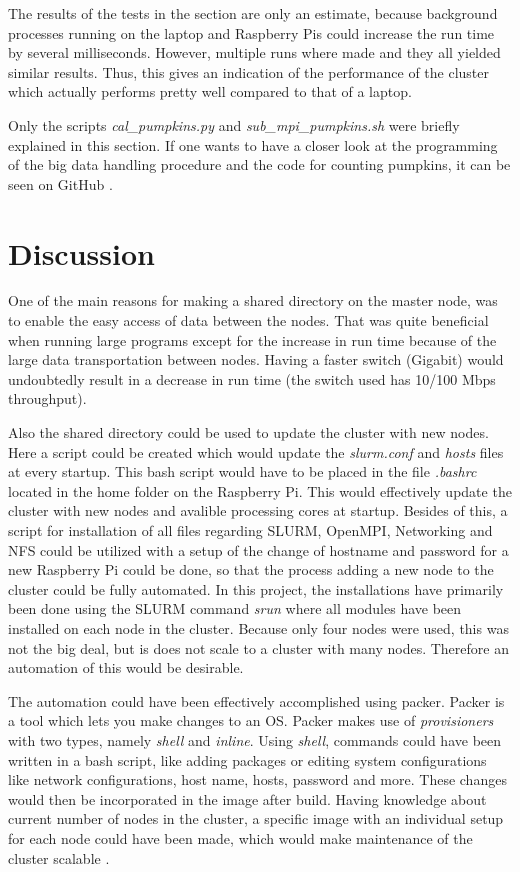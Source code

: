 \documentclass[../Head/Report.tex]{subfiles}
\begin{document}
The results of the tests in the section are only an estimate, because background processes running on the laptop and Raspberry Pis could increase the run time by several milliseconds. However, multiple runs where made and they all yielded similar results. Thus, this gives an indication of the performance of the cluster which actually performs pretty well compared to that of a laptop. 

Only the scripts \textit{cal\_pumpkins.py} and \textit{sub\_mpi\_pumpkins.sh} were briefly explained in this section. If one wants to have a closer look at the programming of the big data handling procedure and the code for counting pumpkins, it can be seen on GitHub \cite{kenni_github}. 
 
\section{Discussion}
One of the main reasons for making a shared directory on the master node, was to enable the easy access of data between the nodes. That was quite beneficial when running large programs except for the increase in run time because of the large data transportation between nodes. Having a faster switch (Gigabit) would undoubtedly result in a decrease in run time (the switch used has 10/100 Mbps throughput).  

Also the shared directory could be used to update the cluster with new nodes. Here a script could be created which would update the \textit{slurm.conf} and \textit{hosts} files at every startup. This bash script would have to be placed in the file \textit{.bashrc} located in the home folder on the Raspberry Pi. This would effectively update the cluster with new nodes and avalible processing cores at startup. Besides of this, a script for installation of all files regarding SLURM, OpenMPI, Networking and NFS could be utilized with a setup of the change of hostname and password for a new Raspberry Pi could be done, so that the process adding a new node to the cluster could be fully automated. In this project, the installations have primarily been done using the SLURM command \textit{srun} where all modules have been installed on each node in the cluster. Because only four nodes were used, this was not the big deal, but is does not scale to a cluster with many nodes. Therefore an automation of this would be desirable.  

The automation could have been effectively accomplished using packer. Packer is a tool which lets you make changes to an OS. Packer makes use of \textit{provisioners} with two types, namely \textit{shell} and \textit{inline}. Using \textit{shell}, commands could have been written in a bash script, like adding packages or editing system configurations like network configurations, host name, hosts, password and more. These changes would then be incorporated in the image after build. Having knowledge about current number of nodes in the cluster, a specific image with an individual setup for each node could have been made, which would make maintenance of the cluster scalable \cite{packer}.      
\end{document}
